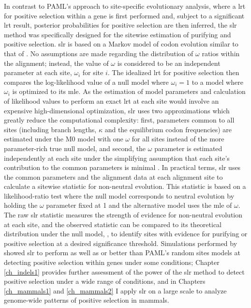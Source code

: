In contrast to PAML's approach to site-specific evolutionary analysis,
where a \ac{lrt} for positive selection within a gene is first
performed and, subject to a significant \ac{lrt} result, \sw posterior
probabilities for positive selection are then inferred, the \ac{slr}
method \citep{Massingham2005} was specifically designed for the
sitewise estimation of purifying and positive selection. \ac{slr} is
based on a Markov model of codon evolution similar to that of
\citet{Goldman1994a}. No assumptions are made regarding the
distribution of $\omega$ ratios within the alignment; instead, the
value of $\omega$ is considered to be an independent parameter at each
site, $\omega_{i}$ for site $i$. The idealized \sw \ac{lrt} for
positive selection then compares the log-likelihood value of a null
model where $\omega_{i}=1$ to a model where $\omega_{i}$ is optimized
to its \ac{mle}. As the estimation of model parameters and calculation
of likelihood values to perform an exact \ac{lrt} at each site would
involve an expensive high-dimensional optimization, \ac{slr} uses two
approximations which greatly reduce the computational complexity:
first, parameters common to all sites (including branch lengths,
$\kappa$ and the equilibrium codon frequencies) are estimated under
the M0 model \citep{Yang2000CodonSubstitution} with one $\omega$ for
all sites instead of the more parameter-rich true null model, and
second, the \sw $\omega$ parameter is estimated independently at each
site under the simplifying assumption that each site's contribution to
the common parameters is minimal \citep{Massingham2005}. In practical
terms, \ac{slr} uses the common parameters and the alignment data at
each alignment site to calculate a sitewise statistic for non-neutral
evolution. This statistic is based on a likelihood-ratio test where
the null model corresponds to neutral evolution by holding the
$\omega$ parameter fixed at 1 and the alternative model uses the
\ac{mle} of $\omega$. The raw \ac{slr} statistic measures the strength
of evidence for non-neutral evolution at each site, and the observed
statistic can be compared to its theoretical distribution under the
null model, \chisq, to identify sites with evidence for purifying or
positive selection at a desired significance threshold. Simulations
performed by \citet{Massingham2005} showed \ac{slr} to perform as well
as or better than PAML's random sites models at detecting positive
selection within genes under some conditions; Chapter \ref{ch_indels1}
provides further assessment of the power of the \ac{slr} method to
detect \sw positive selection under a wide range of conditions, and in
Chapters \ref{ch_mammals1} and \ref{ch_mammals2} I apply \ac{slr} on a
large scale to analyze genome-wide patterns of \sw positive selection
in mammals.

